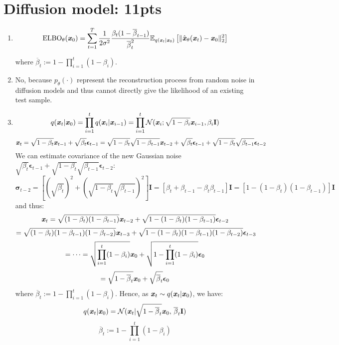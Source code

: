 \documentclass[12pt]{article}
\begin{document}
\section{Diffusion model: 11pts}
\begin{enumerate}
    \item \[\text{ELBO}_{\theta}(\textbf{\textit{x}}_0) = \sum_{t=1}^{T}\frac{1}{2\sigma^2}\frac{\beta_{t}(1-\overline{\beta}_{t-1})}{\overline{\beta}_{t}^{2}}\mathbb{E}_{q(\textbf{\textit{x}}_t|\textbf{\textit{x}}_0)}\left[\|\hat{\textbf{\textit{x}}}_{\theta}(\textbf{\textit{x}}_t)-\textbf{\textit{x}}_0\|_2^2\right]\]
    
    where $\overline{\beta}_t := 1 - \prod_{i=1}^{t}(1-\beta_i)$.
    \item No, because $p_{\theta}(\cdot)$ represent the reconstruction process from random noise in diffusion models and thus cannot directly give the likelihood of an existing test sample.
    
    \item \[q(\textbf{\textit{x}}_t|\textbf{\textit{x}}_0) = \prod_{i=1}^{t}q(\textbf{\textit{x}}_i|\textbf{\textit{x}}_{i-1}) = \prod_{i=1}^{t}\mathcal{N}(\textbf{\textit{x}}_i;\sqrt{1-\beta_i}\textbf{\textit{x}}_{i-1},\beta_i\textbf{I})\]
    \[\textbf{\textit{x}}_t = \sqrt{1 - \beta_t}\textbf{\textit{x}}_{t-1} + \sqrt{\beta_t}\bm{\epsilon}_{t-1} = \sqrt{1 - \beta_t}\sqrt{1 - \beta_{t-1}}\textbf{\textit{x}}_{t-2} + \sqrt{\beta_t}\bm{\epsilon}_{t-1} + \sqrt{1 - \beta_t}\sqrt{\beta_{t-1}}\bm{\epsilon}_{t-2}\]
    We can estimate covariance of the new Gaussian noise $\sqrt{\beta_t}\bm{\epsilon}_{t-1} + \sqrt{1 - \beta_t}\sqrt{\beta_{t-1}}\bm{\epsilon}_{t-2}$:
    \[\bm{\sigma}_{t-2} = [(\sqrt{\beta_t})^2 + (\sqrt{1 - \beta_t}\sqrt{\beta_{t-1}})^2]\mathbf{I} = [\beta_t + \beta_{t-1} - \beta_t\beta_{t-1}]\mathbf{I} = [1-(1-\beta_t)(1-\beta_{t-1})]\mathbf{I}\]
    and thus:
    \[\textbf{\textit{x}}_t = \sqrt{(1-\beta_t)(1-\beta_{t-1})}\textbf{\textit{x}}_{t-2} + \sqrt{1 - (1-\beta_t)(1-\beta_{t-1})}\bm{\epsilon}_{t-2}\]
    \[= \sqrt{(1-\beta_t)(1-\beta_{t-1})(1-\beta_{t-2})}\textbf{\textit{x}}_{t-3} + \sqrt{1 - (1-\beta_t)(1-\beta_{t-1})(1-\beta_{t-2})}\bm{\epsilon}_{t-3}\]
    \[=\dots=\sqrt{\prod_{i=1}^{t}(1-\beta_i)}\textbf{\textit{x}}_0 + \sqrt{1-\prod_{i=1}^{t}(1-\beta_i)}\bm{\epsilon}_0\]
    \[= \sqrt{1-\overline{\beta}_t}\textbf{\textit{x}}_0 + \sqrt{\overline{\beta}_t}\bm{\epsilon}_0\]
    where $\overline{\beta}_t := 1 - \prod_{i=1}^{t}(1-\beta_i)$. Hence, as $\textbf{\textit{x}}_t\sim q(\textbf{\textit{x}}_t|\textbf{\textit{x}}_0)$, we have:
    \[q(\textbf{\textit{x}}_t|\textbf{\textit{x}}_0) = \mathcal{N}(\textbf{\textit{x}}_t | \sqrt{1-\overline{\beta}_t}\textbf{\textit{x}}_0,\,\overline{\beta}_t\mathbf{I})\]
    \[\overline{\beta}_t := 1 - \prod_{i=1}^{t}(1-\beta_i)\]
    \newpage


\end{enumerate}
\end{document}
